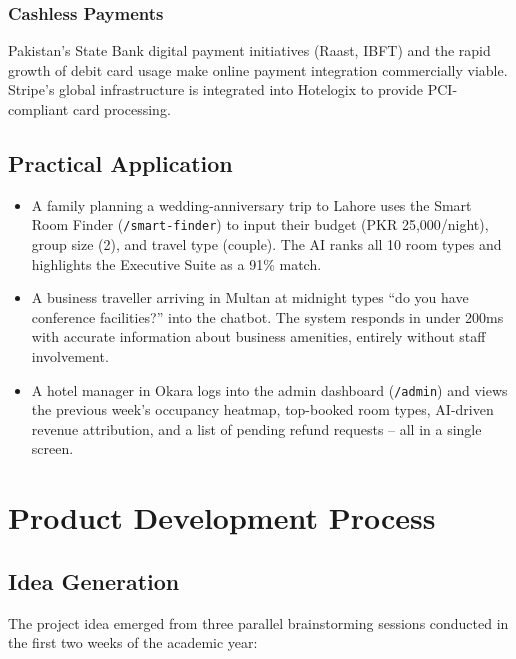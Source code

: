\documentclass[12pt,a4paper]{report}
\begin{document}
\subsection*{Cashless Payments}
Pakistan's State Bank digital payment initiatives (Raast, IBFT) and the rapid growth of debit card usage make online payment integration commercially viable. Stripe's global infrastructure is integrated into Hotelogix to provide PCI-compliant card processing.

\section{Practical Application}

\begin{itemize}[leftmargin=*, label=\textbullet]
  \item A family planning a wedding-anniversary trip to Lahore uses the Smart Room Finder (\texttt{/smart-finder}) to input their budget (PKR 25,000/night), group size (2), and travel type (couple). The AI ranks all 10 room types and highlights the Executive Suite as a 91\% match.
  \item A business traveller arriving in Multan at midnight types ``do you have conference facilities?'' into the chatbot. The system responds in under 200ms with accurate information about business amenities, entirely without staff involvement.
  \item A hotel manager in Okara logs into the admin dashboard (\texttt{/admin}) and views the previous week's occupancy heatmap, top-booked room types, AI-driven revenue attribution, and a list of pending refund requests -- all in a single screen.
\end{itemize}

\chapter{Product Development Process}

\section{Idea Generation}

The project idea emerged from three parallel brainstorming sessions conducted in the first two weeks of the academic year:
\end{document}
